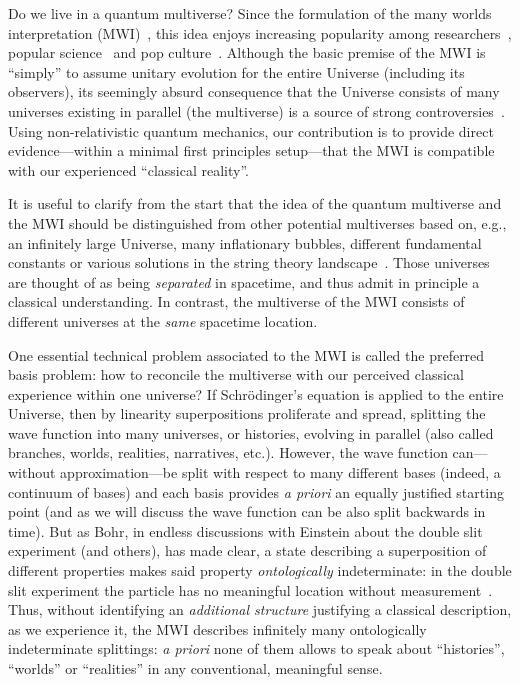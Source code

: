 \documentclass[pre,onecolumn,12pt,aps,longbibliography,nofootinbib]{revtex4-2}
\newcommand{\new}[1]{#1}
\begin{document}
Do we live in a quantum multiverse? Since the formulation of the many worlds interpretation (MWI)~\cite{EverettRMP1957, DeWittPT1970, Vaidman2021}, this idea enjoys increasing popularity among researchers~\cite{Carr2007, SaundersEtAlBook2010, WallaceBook2012}, popular science~\cite{CarrollPodcast2022} and pop culture~\cite{EEAAO2022}. Although the basic premise of the MWI is ``simply'' to assume \new{unitary evolution} for the entire Universe (including its observers), its seemingly absurd consequence that the Universe consists of many universes existing in parallel (the multiverse) is a source of strong controversies~\cite{GisinArXiv2022}. Using non-relativistic quantum mechanics, our contribution is to provide direct evidence---within a minimal first principles setup---that the MWI is compatible with our experienced ``classical reality''.

It is useful to clarify from the start that the idea of the quantum multiverse and the MWI should be distinguished from other potential multiverses based on, e.g., \new{an infinitely large Universe}, many inflationary bubbles, different fundamental constants or various solutions in the string theory landscape~\cite{TegmarkSA2003, Carr2007}. Those universes are thought of as being \emph{separated} in spacetime, and thus admit in principle a classical understanding. In contrast, the multiverse of the MWI consists of different universes at the \emph{same} spacetime location.

\new{One} essential technical problem associated to the MWI is called the preferred basis problem: how to reconcile the multiverse with our perceived classical experience within one universe? If \new{Schr\"odinger's equation} is applied to the entire Universe, then by linearity superpositions proliferate and spread, splitting the wave function into many universes, or histories, evolving in parallel (also called branches, worlds, realities, narratives, etc.). However, the wave function can---without approximation---be split with respect to many different bases (indeed, a continuum of bases) and each basis provides \emph{a priori} an equally justified starting point (and as we will discuss the wave function can be also split backwards in time). But as Bohr, in endless discussions with Einstein about the double slit experiment (and others), has made clear, a state describing a superposition of different properties makes said property \emph{ontologically} indeterminate: in the double slit experiment the particle has no meaningful location without measurement~\cite{Barad2007}. Thus, without identifying an \emph{additional structure} justifying a classical description, as we experience it, the MWI describes infinitely many ontologically indeterminate splittings: \emph{a priori} none of them allows to speak about ``histories'', ``worlds'' or ``realities'' in any conventional, meaningful sense.
\end{document}
